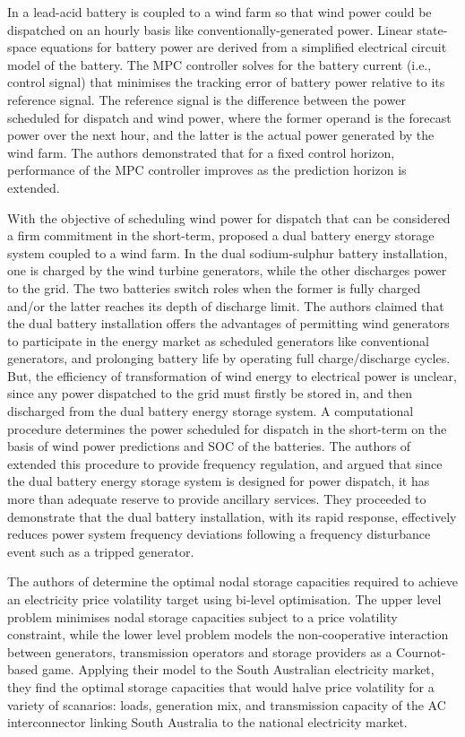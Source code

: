 \documentclass[a4paper, 10pt, twocolumn, preprint, 3p]{elsarticle}
\begin{document}
In \cite{TBBH10} a lead-acid battery is coupled to a wind farm so that wind power could be dispatched on an hourly basis like conventionally-generated power.  Linear state-space equations for battery power are derived from a simplified electrical circuit model of the battery.  The MPC controller solves for the battery current (i.e., control signal) that minimises the tracking error of battery power relative to its reference signal.  The reference signal is the difference between the power scheduled for dispatch and wind power, where the former operand is the forecast power over the next hour, and the latter is the actual power generated by the wind farm.  The authors demonstrated that for a fixed control horizon, performance of the MPC controller improves as the prediction horizon is extended.

With the objective of scheduling wind power for dispatch that can be considered a firm commitment in the short-term, \cite{YCTL10,YCTL12} proposed a dual battery energy storage system coupled to a wind farm.  In the dual sodium-sulphur battery installation, one is charged by the wind turbine generators, while the other discharges power to the grid.  The two batteries switch roles when the former is fully charged and/or the latter reaches its depth of discharge limit.  The authors claimed that the dual battery installation offers the advantages of permitting wind generators to participate in the energy market as scheduled generators like conventional generators, and prolonging battery life by operating full charge/discharge cycles.  But, the efficiency of transformation of wind energy to electrical power is unclear, since any power dispatched to the grid must firstly be stored in, and then discharged from the dual battery energy storage system.  A computational procedure determines the power scheduled for dispatch in the short-term on the basis of wind power predictions and SOC of the batteries.  The authors of \cite{YCTL14} extended this procedure to provide frequency regulation, and argued that since the dual battery energy storage system is designed for power dispatch, it has more than adequate reserve to provide ancillary services.  They proceeded to demonstrate that the dual battery installation, with its rapid response, effectively reduces power system frequency deviations following a frequency disturbance event such as a tripped generator.

The authors of \cite{MNAC17} determine the optimal nodal storage capacities required to achieve an electricity price volatility target using bi-level optimisation.  The upper level problem minimises nodal storage capacities subject to a price volatility constraint, while the lower level problem models the non-cooperative interaction between generators, transmission operators and storage providers as a Cournot-based game.  Applying their model to the South Australian electricity market, they find the optimal storage capacities that would halve price volatility for a variety of scanarios: loads, generation mix, and transmission capacity of the AC interconnector linking South Australia to the national electricity market.
\end{document}
